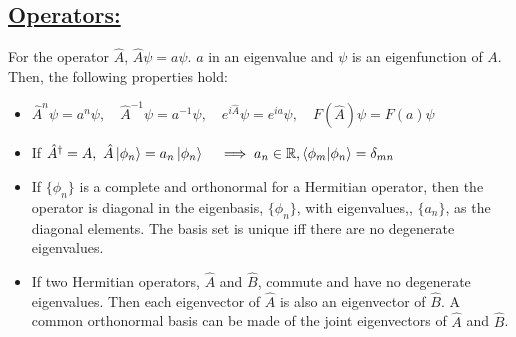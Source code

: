 \subsection*{\underline{Operators:}}
For the operator $\hat{A}$, $\hat{A}\psi=a\psi$. $a$ in an eigenvalue and $\psi$ is an eigenfunction of $A$. Then, the following properties hold:
\begin{itemize}
    \item $\hat{A}^n\psi=a^n\psi,\quad \hat{A}^{-1}\psi=a^{-1}\psi,\quad e^{i\hat{A}}\psi=e^{ia}\psi,\quad F(\hat{A})\psi=F(a)\psi$
    \item If $\hat{A}^{\dagger}=A,\ \hat{A}\ket{\phi_n}=a_n\ket{\phi_n} \quad \implies a_n\in \mathbb{R}, \braket{\phi_m|\phi_n}=\delta_{mn}$
    \item If $\{\phi_n\}$ is a complete and orthonormal for a Hermitian operator, then the operator is diagonal in the eigenbasis, $\{\phi_n\}$, with eigenvalues,, $\{a_n\}$, as the diagonal elements. The basis set is unique iff there are no degenerate eigenvalues.
    \item If two Hermitian operators, $\hat{A}$ and $\hat{B}$, commute and have no degenerate eigenvalues. Then each eigenvector of $\hat{A}$ is also an eigenvector of $\hat{B}$. A common orthonormal basis can be made of the joint eigenvectors of $\hat{A}$ and $\hat{B}$.
\end{itemize}